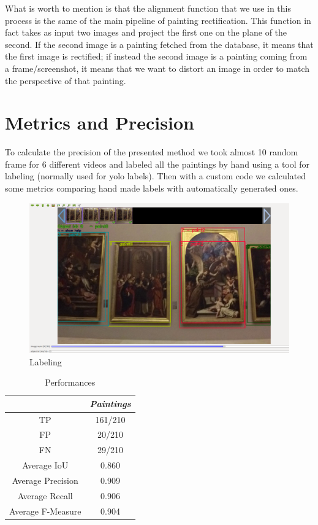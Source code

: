\documentclass[conference]{IEEEtran}
\begin{document}
What is worth to mention is that the alignment function that we use in this process is the same of the main pipeline of painting rectification. This function in fact takes as input two images and project the first one on the plane of the second. If the second image is a painting fetched from the database, it means that the first image is rectified; if instead the second image is a painting coming from a frame/screenshot, it means that we want to distort an image in order to match the perspective of that painting.\\

\section{Metrics and Precision}
To calculate the precision of the presented method we took almost 10 random frame for 6 different videos and labeled all the paintings by hand using a tool for labeling (normally used for yolo labels). Then with a custom code we calculated some metrics comparing hand made labels with automatically generated ones.

\begin{figure}[htbp]
\centerline{\includegraphics[width=0.8\columnwidth]{../Labeling_precision_metrics/Precision_Labeling.png}}
\caption{Labeling}
\label{fig_labeling}
\end{figure}
\bigskip

\begin{table}[htbp]
\caption{Performances}
\begin{center}
\begin{tabular}{|c|c|}
\hline
\textbf{} & \textbf{\textit{Paintings}} \\
\hline
TP& 161/210\\
\hline
FP& 20/210\\
\hline
FN& 29/210\\
\hline
Average IoU& 0.860\\
\hline
Average Precision& 0.909\\
\hline
Average Recall& 0.906\\
\hline
Average F-Measure& 0.904\\
\hline
\end{tabular}
\label{tab1}
\end{center}
\end{table}
\end{document}
